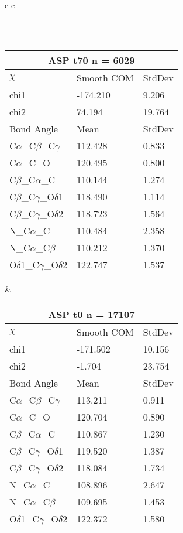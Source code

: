 \begin{longtable}{ c c }
\begin{tabular}{ l l l }
  \end{tabular}
  \\
  \begin{tabular}{ l l l }
  \toprule
  \multicolumn{3}{c}{ASP \textbf{t70} n = 6029} \\ \toprule
  $\chi$       & Smooth COM & StdDev \\ \midrule
  chi1 & -174.210 & 9.206 \\ 
  chi2 & 74.194 & 19.764 \\ \midrule
  Bond Angle   & Mean     & StdDev \\ \midrule
  C$\alpha$\_C$\beta$\_C$\gamma$ & 112.428 & 0.833\\
  C$\alpha$\_C\_O & 120.495 & 0.800\\
  C$\beta$\_C$\alpha$\_C & 110.144 & 1.274\\
  C$\beta$\_C$\gamma$\_O$\delta$1 & 118.490 & 1.114\\
  C$\beta$\_C$\gamma$\_O$\delta$2 & 118.723 & 1.564\\
  N\_C$\alpha$\_C & 110.484 & 2.358\\
  N\_C$\alpha$\_C$\beta$ & 110.212 & 1.370\\
  O$\delta$1\_C$\gamma$\_O$\delta$2 & 122.747 & 1.537\\
  \bottomrule
  \end{tabular}
  &
  \begin{tabular}{ l l l }
  \toprule
  \multicolumn{3}{c}{ASP \textbf{t0} n = 17107} \\ \toprule
  $\chi$       & Smooth COM & StdDev \\ \midrule
  chi1 & -171.502 & 10.156 \\ 
  chi2 & -1.704 & 23.754 \\ \midrule
  Bond Angle   & Mean     & StdDev \\ \midrule
  C$\alpha$\_C$\beta$\_C$\gamma$ & 113.211 & 0.911\\
  C$\alpha$\_C\_O & 120.704 & 0.890\\
  C$\beta$\_C$\alpha$\_C & 110.867 & 1.230\\
  C$\beta$\_C$\gamma$\_O$\delta$1 & 119.520 & 1.387\\
  C$\beta$\_C$\gamma$\_O$\delta$2 & 118.084 & 1.734\\
  N\_C$\alpha$\_C & 108.896 & 2.647\\
  N\_C$\alpha$\_C$\beta$ & 109.695 & 1.453\\
  O$\delta$1\_C$\gamma$\_O$\delta$2 & 122.372 & 1.580\\
  \bottomrule
  \end{tabular}
  \\
  
\end{longtable}    

